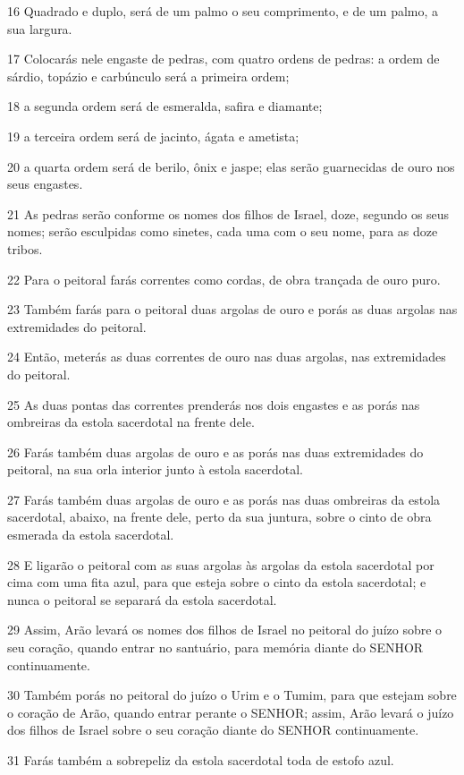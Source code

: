 \par 16 Quadrado e duplo, será de um palmo o seu comprimento, e de um palmo, a sua largura.
\par 17 Colocarás nele engaste de pedras, com quatro ordens de pedras: a ordem de sárdio, topázio e carbúnculo será a primeira ordem;
\par 18 a segunda ordem será de esmeralda, safira e diamante;
\par 19 a terceira ordem será de jacinto, ágata e ametista;
\par 20 a quarta ordem será de berilo, ônix e jaspe; elas serão guarnecidas de ouro nos seus engastes.
\par 21 As pedras serão conforme os nomes dos filhos de Israel, doze, segundo os seus nomes; serão esculpidas como sinetes, cada uma com o seu nome, para as doze tribos.
\par 22 Para o peitoral farás correntes como cordas, de obra trançada de ouro puro.
\par 23 Também farás para o peitoral duas argolas de ouro e porás as duas argolas nas extremidades do peitoral.
\par 24 Então, meterás as duas correntes de ouro nas duas argolas, nas extremidades do peitoral.
\par 25 As duas pontas das correntes prenderás nos dois engastes e as porás nas ombreiras da estola sacerdotal na frente dele.
\par 26 Farás também duas argolas de ouro e as porás nas duas extremidades do peitoral, na sua orla interior junto à estola sacerdotal.
\par 27 Farás também duas argolas de ouro e as porás nas duas ombreiras da estola sacerdotal, abaixo, na frente dele, perto da sua juntura, sobre o cinto de obra esmerada da estola sacerdotal.
\par 28 E ligarão o peitoral com as suas argolas às argolas da estola sacerdotal por cima com uma fita azul, para que esteja sobre o cinto da estola sacerdotal; e nunca o peitoral se separará da estola sacerdotal.
\par 29 Assim, Arão levará os nomes dos filhos de Israel no peitoral do juízo sobre o seu coração, quando entrar no santuário, para memória diante do SENHOR continuamente.
\par 30 Também porás no peitoral do juízo o Urim e o Tumim, para que estejam sobre o coração de Arão, quando entrar perante o SENHOR; assim, Arão levará o juízo dos filhos de Israel sobre o seu coração diante do SENHOR continuamente.
\par 31 Farás também a sobrepeliz da estola sacerdotal toda de estofo azul.

